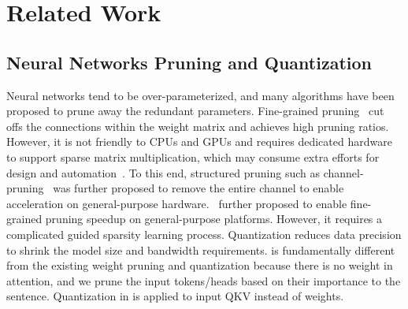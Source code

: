\section{Related Work}
\subsection{Neural Networks Pruning and Quantization}
Neural networks tend to be over-parameterized, and many algorithms have been proposed to prune away the redundant parameters. Fine-grained pruning~\cite{han2016deep, wang2020apq} cut offs the connections within the weight matrix and achieves high pruning ratios. However, it is not friendly to CPUs and GPUs and requires dedicated hardware\cite{pal2018outerspace, sparch} to support sparse matrix multiplication, which may consume extra efforts for design and automation~\cite{wang2020gcn, mao2019park, wang2018learning}. To this end, structured pruning such as channel-pruning~\cite{he2017channel, he2018amc} was further proposed to remove the entire channel to enable acceleration on general-purpose hardware.~\cite{park2016faster} further proposed to enable fine-grained pruning speedup on general-purpose platforms. However, it requires a complicated guided sparsity learning process. Quantization reduces data precision to shrink the model size and bandwidth requirements. 
\name is fundamentally different from the existing weight pruning and quantization because there is no weight in attention, and we prune the input tokens/heads based on their importance to the sentence. Quantization in \name is applied to input QKV instead of weights.


